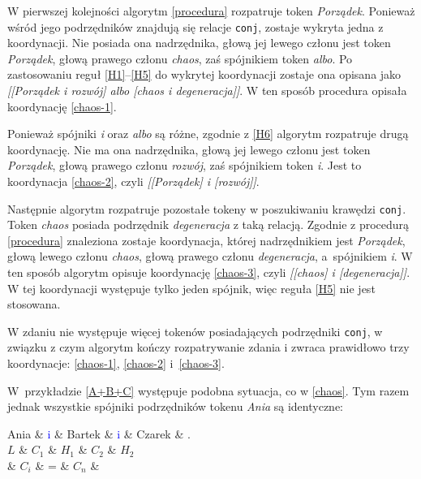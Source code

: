 W pierwszej kolejności algorytm \eqref{procedura} rozpatruje token \textit{Porządek}. Ponieważ wśród jego podrzędników znajdują się relacje \texttt{conj}, zostaje wykryta jedna z koordynacji. Nie posiada ona nadrzędnika, głową jej lewego członu jest token \textit{Porządek}, głową prawego członu \textit{chaos}, zaś spójnikiem token \textit{albo}. Po zastosowaniu reguł \ref{H1}--\ref{H5} do wykrytej koordynacji zostaje ona opisana jako \textit{[[Porządek i rozwój] albo [chaos i degeneracja]]}. W ten sposób procedura opisała koordynację \eqref{chaos-1}. 

Ponieważ spójniki \emph{i} oraz \emph{albo} są różne, zgodnie z \ref{H6} algorytm rozpatruje drugą koordynację. Nie ma ona nadrzędnika, głową jej lewego członu jest token \textit{Porządek}, głową prawego członu \textit{rozwój}, zaś spójnikiem token \textit{i}. Jest to koordynacja \eqref{chaos-2}, czyli \textit{[[Porządek] i [rozwój]]}.

Następnie algorytm rozpatruje pozostałe tokeny w poszukiwaniu krawędzi \texttt{conj}. Token \textit{chaos} posiada podrzędnik \textit{degeneracja} z taką relacją. Zgodnie z procedurą \eqref{procedura} znaleziona zostaje koordynacja, której nadrzędnikiem jest \textit{Porządek}, głową lewego członu \textit{chaos}, głową prawego członu \textit{degeneracja}, a~spójnikiem \textit{i}. W ten sposób algorytm opisuje koordynację \eqref{chaos-3}, czyli \textit{[[chaos] i [degeneracja]]}. W tej koordynacji występuje tylko jeden spójnik, więc reguła \ref{H5} nie jest stosowana.

W zdaniu nie występuje więcej tokenów posiadających podrzędniki \texttt{conj}, w związku z czym algorytm kończy rozpatrywanie zdania i zwraca prawidłowo trzy koordynacje: \eqref{chaos-1}, \eqref{chaos-2} i~\eqref{chaos-3}.

W~przykładzie \eqref{A+B+C} występuje podobna sytuacja, co w \eqref{chaos}. Tym razem jednak wszystkie spójniki podrzędników tokenu \emph{Ania} są identyczne:

\begin{exe}
\ex \label{A+B+C}
\begin{dependency}[baseline=2.9ex]
\begin{deptext}[column sep=1em, row sep=.3ex]
Ania \& \textcolor{blue}{i} \& Bartek \& \textcolor{blue}{i} \& Czarek \& .  \\ 
$L$ \& $C_{1}$ \& $H_{1}$ \& $C_{2}$ \& $H_{2}$ \\
 \& $C_{i}$ \& = \& $C_{n}$ \& \\
\end{deptext}
\end{dependency}
\end{exe}

